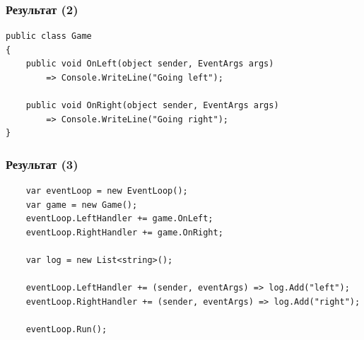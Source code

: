 \documentclass{../../slides-style}
\begin{document}
    \begin{frame}[fragile]
        \frametitle{Результат (2)}
        \begin{footnotesize}
            \begin{verbatim}
public class Game
{
    public void OnLeft(object sender, EventArgs args)
        => Console.WriteLine("Going left");

    public void OnRight(object sender, EventArgs args)
        => Console.WriteLine("Going right");
}
            \end{verbatim}
        \end{footnotesize}
    \end{frame}

    \begin{frame}[fragile]
        \frametitle{Результат (3)}
        \begin{footnotesize}
            \begin{verbatim}
    var eventLoop = new EventLoop();
    var game = new Game();
    eventLoop.LeftHandler += game.OnLeft;
    eventLoop.RightHandler += game.OnRight;

    var log = new List<string>();

    eventLoop.LeftHandler += (sender, eventArgs) => log.Add("left");
    eventLoop.RightHandler += (sender, eventArgs) => log.Add("right");

    eventLoop.Run();
            \end{verbatim}
        \end{footnotesize}
    \end{frame}
\end{document}
